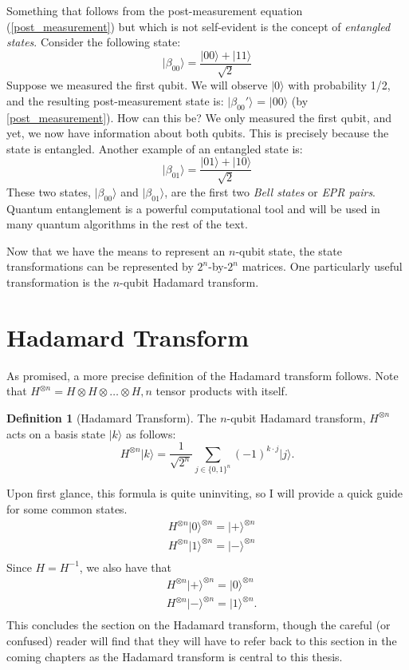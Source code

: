 \documentclass[12pt,twoside]{reedthesis}
\theoremstyle{definition}
\newtheorem{definition}[theorem]{Definition}
\newcommand{\ketz}{\ensuremath{\lvert 0\rangle}\xspace}
\newcommand{\keto}{\ensuremath{\lvert 1\rangle}\xspace}
\newcommand{\ket}[1]{\ensuremath{\lvert #1\rangle}\xspace}
\newcommand{\Hplus}{\ensuremath{\lvert + \rangle}\xspace}
\newcommand{\Hminus}{\ensuremath{\lvert- \rangle}\xspace}
\begin{document}
Something that follows from the post-measurement equation (\ref{post_measurement}) but which is not self-evident is the concept of \textit{entangled states}. Consider the following state:
\begin{equation*}
\ket{\beta_{00}} = \frac{\ket{00} + \ket{11}}{\sqrt{2}}
\end{equation*}
Suppose we measured the first qubit. We will observe \ket{0} with probability 1/2, and the resulting post-measurement state is: \ket{\beta_{00}'} = \ket{00} (by \ref{post_measurement}). How can this be? We only measured the first qubit, and yet, we now have information about both qubits. This is precisely because the state is entangled. Another example of an entangled state is:
\begin{equation*}
\ket{\beta_{01}} = \frac{\ket{01} + \ket{10}}{\sqrt{2}}
\end{equation*}
These two states, \ket{\beta_{00}} and \ket{\beta_{01}}, are the first two \textit{Bell states} or \textit{EPR pairs}. Quantum entanglement is a powerful computational tool and will be used in many quantum algorithms in the rest of the text. 

Now that we have the means to represent an $n$-qubit state, the state transformations can be represented by $2^n$-by-$2^n$ matrices. One particularly useful transformation is the $n$-qubit Hadamard transform.

\section{Hadamard Transform}

As promised, a more precise definition of the Hadamard transform follows. Note that $H^{\otimes n} = H \otimes H \otimes \ldots \otimes H, n$ tensor products with itself. 

\begin{definition}[Hadamard Transform] The $n$-qubit Hadamard transform, $H^{\otimes n}$ acts on a basis state $\ket{k}$ as follows:
\begin{equation*}
H^{\otimes n} \ket{k} = \frac{1}{\sqrt{2^n}} \sum_{j \in \{0,1\}^n} (-1)^{k \cdot j} \ket{j}.
\end{equation*}
\end{definition}
Upon first glance, this formula is quite uninviting, so I will provide a quick guide for some common states. 
\begin{align*}
& H^{\otimes n} \ketz^{\otimes n} = \Hplus^{\otimes n} \\
& H^{\otimes n} \keto^{\otimes n} = \Hminus^{\otimes n} \\
\end{align*}
Since $H = H^{-1}$, we also have that
\begin{align*}
& H^{\otimes n} \Hplus^{\otimes n} =  \ketz^{\otimes n} \\
& H^{\otimes n} \Hminus^{\otimes n} = \keto^{\otimes n}. \\
\end{align*}
This concludes the section on the Hadamard transform, though the careful (or confused) reader will find that they will have to refer back to this section in the coming chapters as the Hadamard transform is central to this thesis.
\end{document}
